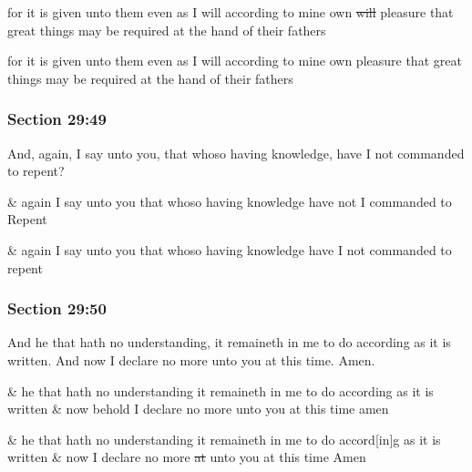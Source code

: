 		\begin{framed}
		\scriptsize
			\begin{compactdesc}
				\item[JSP] for it is given unto them even as I will according to mine own \sout{will} pleasure that great things may be required at the hand of their fathers
				\item[HSN] for it is given unto them even as I will according to mine own pleasure that great things may be required at the hand of their fathers
			\end{compactdesc}
		\end{framed}

	\subsubsection{Section 29:49} %
		\label{DC29-49}

		And, again, I say unto you, that whoso having knowledge, have I not commanded to repent?

		\begin{framed}
		\scriptsize
			\begin{compactdesc}
				\item[JSP] \& again I say unto you that whoso having knowledge have not I commanded to Repent
				\item[HSN] \& again I say unto you that whoso having knowledge have I not commanded to repent
			\end{compactdesc}
		\end{framed}

	\subsubsection{Section 29:50} %
		\label{DC29-50}

		And he that hath no understanding, it remaineth in me to do according as it is written.  And now I declare no more unto you at this time.  Amen.

		\begin{framed}
		\scriptsize
			\begin{compactdesc}
				\item[JSP] \& he that hath no understanding it remaineth in me to do according as it is written \& now behold I declare no more unto you at this time amen
				\item[HSN] \& he that hath no understanding it remaineth in me to do accord[in]g as it is written \& now I declare no more \sout{at} unto you at this time Amen
			\end{compactdesc}
		\end{framed}